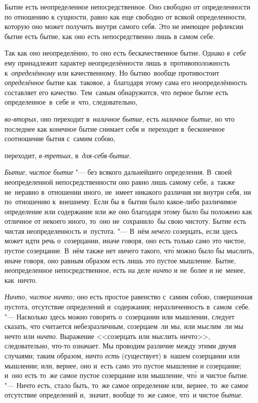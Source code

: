 Бытие есть неопределенное непосредственное. Оно свободно от определенности по
отношению к сущности, равно как еще свободно от всякой определенности, которую
оно может получить внутри самого себя. Это не имеющее рефлексии бытие есть
бытие, как оно есть непосредственно лишь в самом себе.

Так как оно неопределённо, то оно есть бескачественное бытие. Однако
{\em в~себе} ему принадлежит характер неопределённости лишь в~противоположность
к~{\em определённому} или качественному. Но бытию~вообще противостоит
{\em определённое} бытие как~таковое, а~благодаря этому сама его
неопределённость составляет его качество. Тем~самым обнаружится, что
{\em первое} бытие есть определенное~в~себе и~что, следовательно,

{\em во-вторых}, оно переходит в~{\em наличное бытие}, есть
{\em наличное бытие}, но что последнее как конечное бытие снимает себя
и~переходит в~бесконечное соотношение бытия с~самим собою,

переходит, {\em в-третьих}, в~{\em для-себя-бытие}.



{\em Бытие}, {\em чистое бытие} "--- без всякого дальнейшего определения.
В~своей неопределенной непосредственности оно равно лишь самому себе, а~также
не~неравно в~отношении иного, не~имеет никакого различия ни внутри себя, ни
по~отношению к~внешнему. Если бы в~бытии было какое-либо различимое определение
или содержание или же оно благодаря этому было бы положено как отличное от
некоего иного, то~оно не~сохранило~бы свою чистоту. Бытие есть чистая
неопределенность и~пустота. "--- В~нём {\em нечего} созерцать, если здесь может
идти речь о~созерцании, иначе говоря, оно есть только само это чистое, пустое
созерцание. В~нём также нет ничего такого, чт\'{о} можно было бы мыслить, иначе
говоря, оно равным образом есть лишь это пустое мышление. Бытие, неопределенное
непосредственное, есть на деле {\em ничто} и не~более и не~менее, как~ничто.


{\em Ничто, чистое ничто;} оно есть простое равенство с~самим собою,
совершенная пустота, отсутствие определений и~содержания; неразличенность
в~самом~себе. "--- Насколько здесь можно говорить о~созерцании или мышлении,
следует сказать, что считается небезразличным, созерцаем~ли мы, или мыслим~ли
мы нечто или {\em ничто}. Выражение <<созерцать или мыслить ничто>>,
следовательно, что-то означает. Мы проводим различие между этими двумя
случаями; таким образом, ничто {\em есть} (существует) в~нашем созерцании или
мышлении; или, вернее, оно и~есть само это пустое мышление и созерцание; и~оно
есть то~же самое пустое созерцание или мышление, чт\'{о}~и чистое бытие. "---
Ничто есть, стало быть, то~же самое определение или, вернее, то~же самое
отсутствие определений и,~значит, вообще то~же самое,
чт\'{о}~и чистое {\em бытие}.

